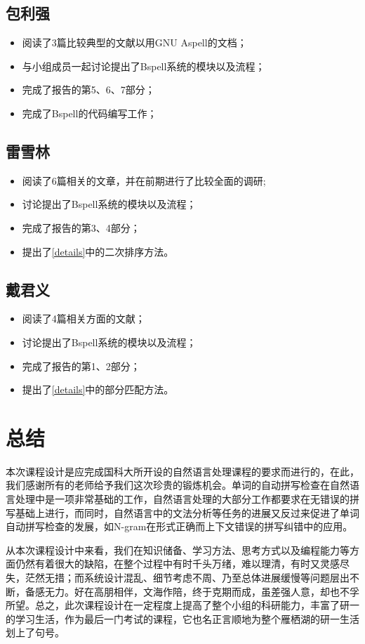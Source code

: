 \documentclass[UTF8,a4paper]{ctexart}
\begin{document}
\subsection{包利强}

\begin{itemize}
\item 阅读了3篇比较典型的文献以用GNU Aspell的文档；
\item 与小组成员一起讨论提出了Bspell系统的模块以及流程；
\item 完成了报告的第5、6、7部分；
\item 完成了Bspell的代码编写工作；
\end{itemize}

\subsection{雷雪林}

\begin{itemize}
\item 阅读了6篇相关的文章，并在前期进行了比较全面的调研;
\item 讨论提出了Bspell系统的模块以及流程；
\item 完成了报告的第3、4部分；
\item 提出了\ref{details}中的二次排序方法。
\end{itemize}

\subsection{戴君义}

\begin{itemize}
\item 阅读了4篇相关方面的文献；
\item 讨论提出了Bspell系统的模块以及流程；
\item 完成了报告的第1、2部分；
\item 提出了\ref{details}中的部分匹配方法。
\end{itemize}

\section{总结}

本次课程设计是应完成国科大所开设的自然语言处理课程的要求而进行的，在此，我们感谢所有的老师给予我们这次珍贵的锻炼机会。单词的自动拼写检查在自然语言处理中是一项非常基础的工作，自然语言处理的大部分工作都要求在无错误的拼写基础上进行，而同时，自然语言中的文法分析等任务的进展又反过来促进了单词自动拼写检查的发展，如N-gram在形式正确而上下文错误的拼写纠错中的应用。

从本次课程设计中来看，我们在知识储备、学习方法、思考方式以及编程能力等方面仍然有着很大的缺陷，在整个过程中有时千头万绪，难以理清，有时又灵感尽失，茫然无措；而系统设计混乱、细节考虑不周、乃至总体进展缓慢等问题层出不断，备感无力。好在高朋相伴，文海作陪，终于克期而成，虽差强人意，却也不孚所望。总之，此次课程设计在一定程度上提高了整个小组的科研能力，丰富了研一的学习生活，作为最后一门考试的课程，它也名正言顺地为整个雁栖湖的研一生活划上了句号。

\clearpage


\end{document}
